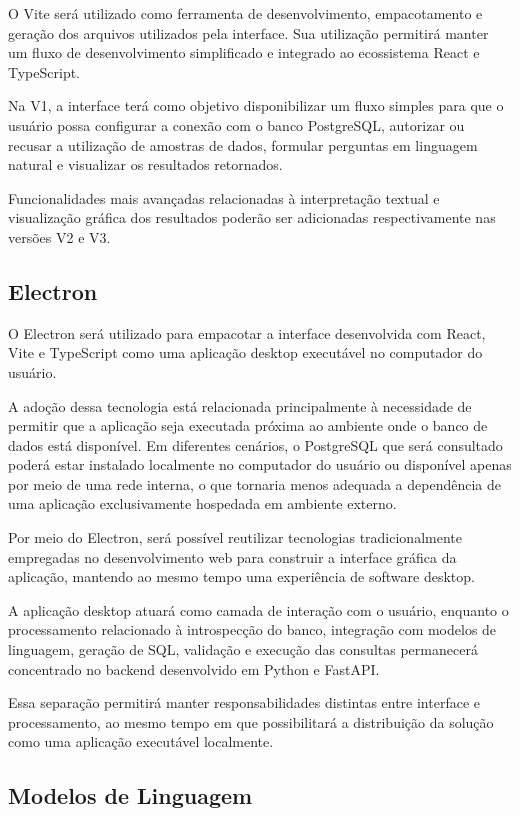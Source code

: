 O Vite será utilizado como ferramenta de desenvolvimento, empacotamento e geração dos arquivos utilizados pela interface. Sua utilização permitirá manter um fluxo de desenvolvimento simplificado e integrado ao ecossistema React e TypeScript.

Na V1, a interface terá como objetivo disponibilizar um fluxo simples para que o usuário possa configurar a conexão com o banco PostgreSQL, autorizar ou recusar a utilização de amostras de dados, formular perguntas em linguagem natural e visualizar os resultados retornados.

Funcionalidades mais avançadas relacionadas à interpretação textual e visualização gráfica dos resultados poderão ser adicionadas respectivamente nas versões V2 e V3.


\subsection{Electron}

O Electron será utilizado para empacotar a interface desenvolvida com React, Vite e TypeScript como uma aplicação desktop executável no computador do usuário.

A adoção dessa tecnologia está relacionada principalmente à necessidade de permitir que a aplicação seja executada próxima ao ambiente onde o banco de dados está disponível. Em diferentes cenários, o PostgreSQL que será consultado poderá estar instalado localmente no computador do usuário ou disponível apenas por meio de uma rede interna, o que tornaria menos adequada a dependência de uma aplicação exclusivamente hospedada em ambiente externo.

Por meio do Electron, será possível reutilizar tecnologias tradicionalmente empregadas no desenvolvimento web para construir a interface gráfica da aplicação, mantendo ao mesmo tempo uma experiência de software desktop.

A aplicação desktop atuará como camada de interação com o usuário, enquanto o processamento relacionado à introspecção do banco, integração com modelos de linguagem, geração de SQL, validação e execução das consultas permanecerá concentrado no backend desenvolvido em Python e FastAPI.

Essa separação permitirá manter responsabilidades distintas entre interface e processamento, ao mesmo tempo em que possibilitará a distribuição da solução como uma aplicação executável localmente.


\subsection{Modelos de Linguagem}

